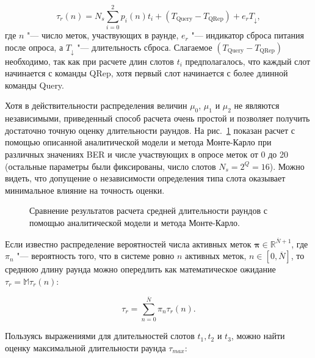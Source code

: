 \begin{equation}\label{eq:ch3_round_duration_of_n}
	\tau_r(n) = N_s \sum\limits_{i=0}^{2}p_i(n)t_i +
		(T_\text{Query} - T_\text{QRep}) +
		e_r T_\downarrow,
\end{equation}
где $n$ "--- число меток, участвующих в раунде, $e_r$ "--- индикатор сброса питания после опроса, а $T_\downarrow$ "--- длительность сброса. Слагаемое $(T_\text{Query} - T_\text{QRep})$ необходимо, так как при расчете длин слотов $t_i$ предполагалось, что каждый слот начинается с команды QRep, хотя первый слот начинается с более длинной команды Query.

Хотя в действительности распределения величин $\mu_0$, $\mu_1$ и $\mu_2$ не являются независимыми, приведенный способ расчета очень простой и позволяет получить достаточно точную оценку длительности раундов. На рис.~\ref{fig:ch3_round_durations_validation} показан расчет с помощью описанной аналитической модели и метода Монте-Карло при различных значениях BER и числе участвующих в опросе меток от 0 до 20 (остальные параметры были фиксированы, число слотов $N_s = 2^Q = 16$). Можно видеть, что допущение о независимости определения типа слота оказывает минимальное влияние на точность оценки.

\begin{figure}[htb]
	\caption[Валидация модели расчета средрней длительности раундов.]{Сравнение результатов расчета средней длительности раундов с помощью аналитической модели и метода Монте-Карло.}
	\label{fig:ch3_round_durations_validation}
\end{figure}


Если известно распределение вероятностей числа активных меток $\bm{\pi} \in \mathbb{R}^{\overline{N}+1}$, где $\pi_n$ "--- вероятность того, что в системе ровно $n$ активных меток, $n \in [0, \overline{N}]$, то среднюю длину раунда можно опередлить как математическое ожидание $\tau_r = \mathbb{M} \tau_r(n)$:

\begin{equation}\label{eq:ch3_round_duration_avg}
	\tau_r = \sum\limits_{n=0}^{\overline{N}} \pi_n \tau_r(n).
\end{equation}

Пользуясь выражениями для длительностей слотов $t_1, t_2$ и $t_3$, можно найти оценку максимальной длительности раунда $\tau_{max}$:

